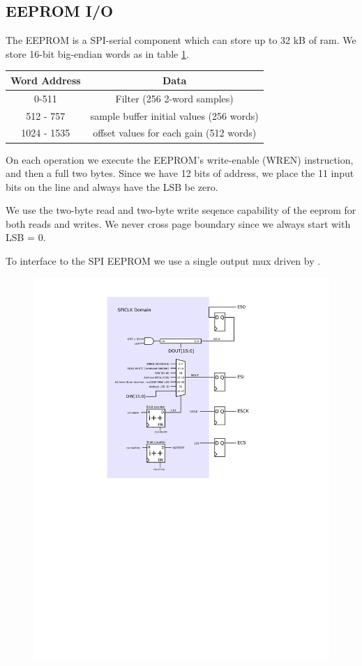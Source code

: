 
\subsection{EEPROM I/O}

The EEPROM is a SPI-serial component which can store up to 32 kB of ram. We store 16-bit big-endian words as in table \ref{eepromaddr}. 
\begin{table}
\begin{tabular}{cc}
Word Address & Data \\
\hline
0-511 & Filter (256 2-word samples) \\
512 - 757 & sample buffer initial values (256 words) \\
1024 - 1535 & offset values for each gain (512 words) \\ 
\end{tabular}
\label{eepromaddr}
\end{table}

On each operation we execute the EEPROM's write-enable (WREN)
instruction, and then a full two bytes.  Since we have 12 bits of
address, we place the 11 input bits on the line and always have the
LSB be zero.

We use the two-byte read and two-byte write seqence capability of the
eeprom for both reads and writes. We never cross page boundary since
we always start with LSB = 0.

To interface to the SPI EEPROM we use a single output mux driven by
.

\begin{figure}[h!]
\includegraphics[scale=0.7]{EEPROMIO.svg}
\end{figure}

